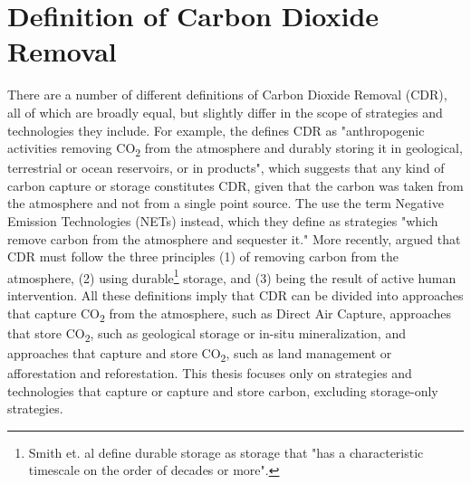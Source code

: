\section{Definition of Carbon Dioxide Removal}
There are a number of different definitions of Carbon Dioxide Removal (CDR), all of which are broadly equal, but slightly differ in the scope of strategies and technologies they include. For example, the \textcite[544]{IPCC2018Global1.5C} defines CDR as "anthropogenic activities removing CO\textsubscript{2} from the atmosphere and durably storing it in geological, terrestrial or ocean reservoirs, or in products", which suggests that any kind of carbon capture or storage constitutes CDR, given that the carbon was taken from the atmosphere and not from a single point source. The \textcite[1]{NAS2018NegativeAgenda} use the term Negative Emission Technologies (NETs) instead, which they define as strategies "which remove carbon from the atmosphere and sequester it." More recently, \textcite[11]{Smith2023TheEdition} argued that CDR must follow the three principles (1) of removing carbon from the atmosphere, (2) using durable\footnote{ Smith et. al define durable storage as storage that "has a characteristic timescale on the order of decades or more".} storage, and (3) being the result of active human intervention. All these definitions imply that CDR can be divided into approaches that capture CO\textsubscript{2} from the atmosphere, such as Direct Air Capture, approaches that store CO\textsubscript{2}, such as geological storage or in-situ mineralization, and approaches that capture and store CO\textsubscript{2}, such as land management or afforestation and reforestation. This thesis focuses only on strategies and technologies that capture or capture and store carbon, excluding storage-only strategies.
